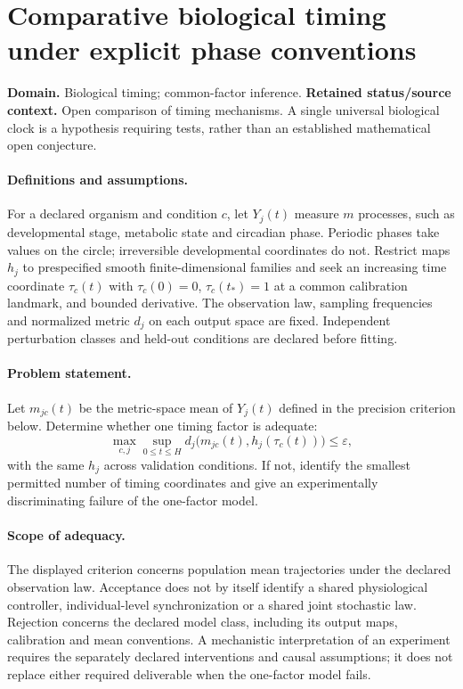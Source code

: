 \documentclass[11pt]{article}
\begin{document}
\section*{Comparative biological timing under explicit phase conventions}
\label{prob:302}
\label{rank:114}
\par\smallskip

\noindent\textbf{Domain.} Biological timing; common-factor inference. \quad \textbf{Retained status/source context.} Open comparison of timing mechanisms. A single universal biological clock is a hypothesis requiring tests, rather than an established mathematical open conjecture.

\paragraph{Definitions and assumptions.} For a declared organism and condition $c$, let $Y_j(t)$ measure $m$ processes, such as developmental stage, metabolic state and circadian phase. Periodic phases take values on the circle; irreversible developmental coordinates do not. Restrict maps $h_j$ to prespecified smooth finite-dimensional families and seek an increasing time coordinate $\tau_c(t)$ with $\tau_c(0)=0$, $\tau_c(t_*)=1$ at a common calibration landmark, and bounded derivative. The observation law, sampling frequencies and normalized metric $d_j$ on each output space are fixed. Independent perturbation classes and held-out conditions are declared before fitting.

\paragraph{Problem statement.} Let $m_{jc}(t)$ be the metric-space mean of $Y_j(t)$ defined in the precision criterion below. Determine whether one timing factor is adequate:
    \[\max_{c,j}\sup_{0\leq t\leq H}
      d_j\bigl(m_{jc}(t),h_j(\tau_c(t))\bigr)\leq\varepsilon,\]
    with the same $h_j$ across validation conditions. If not, identify the smallest permitted number of timing coordinates and give an experimentally discriminating failure of the one-factor model.

\paragraph{Scope of adequacy.} The displayed criterion concerns population mean trajectories under the declared observation law. Acceptance does not by itself identify a shared physiological controller, individual-level synchronization or a shared joint stochastic law. Rejection concerns the declared model class, including its output maps, calibration and mean conventions. A mechanistic interpretation of an experiment requires the separately declared interventions and causal assumptions; it does not replace either required deliverable when the one-factor model fails.
\end{document}
